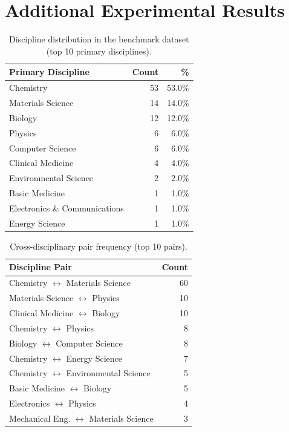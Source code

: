 \documentclass{article}
\begin{document}
\section{Additional Experimental Results}
\label{app:results}

\begin{table}[h]
\centering
\caption{Discipline distribution in the benchmark dataset (top 10 primary disciplines).}
\label{tab:disc_dist}
\small
\begin{tabular}{lrr}
\toprule
\textbf{Primary Discipline} & \textbf{Count} & \textbf{\%} \\
\midrule
Chemistry & 53 & 53.0\% \\
Materials Science & 14 & 14.0\% \\
Biology & 12 & 12.0\% \\
Physics & 6 & 6.0\% \\
Computer Science & 6 & 6.0\% \\
Clinical Medicine & 4 & 4.0\% \\
Environmental Science & 2 & 2.0\% \\
Basic Medicine & 1 & 1.0\% \\
Electronics \& Communications & 1 & 1.0\% \\
Energy Science & 1 & 1.0\% \\
\bottomrule
\end{tabular}
\end{table}

\begin{table}[h]
\centering
\caption{Cross-disciplinary pair frequency (top 10 pairs).}
\label{tab:cross_pairs}
\small
\begin{tabular}{lr}
\toprule
\textbf{Discipline Pair} & \textbf{Count} \\
\midrule
Chemistry $\leftrightarrow$ Materials Science & 60 \\
Materials Science $\leftrightarrow$ Physics & 10 \\
Clinical Medicine $\leftrightarrow$ Biology & 10 \\
Chemistry $\leftrightarrow$ Physics & 8 \\
Biology $\leftrightarrow$ Computer Science & 8 \\
Chemistry $\leftrightarrow$ Energy Science & 7 \\
Chemistry $\leftrightarrow$ Environmental Science & 5 \\
Basic Medicine $\leftrightarrow$ Biology & 5 \\
Electronics $\leftrightarrow$ Physics & 4 \\
Mechanical Eng. $\leftrightarrow$ Materials Science & 3 \\
\bottomrule
\end{tabular}
\end{table}
\end{document}
